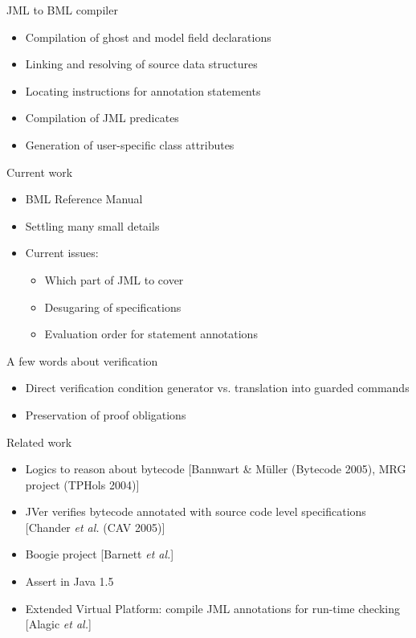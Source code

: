 \documentclass[final,nocolorBG,a4,mobius,nototal,pdf,slideColor]{prosper}
\begin{document}
\begin{slide}{JML to BML compiler}
\begin{itemize}
\item Compilation of ghost and model field declarations

\item Linking and resolving of source data structures

\item Locating instructions for annotation statements

\item Compilation of JML predicates

\item Generation of user-specific class attributes
\end{itemize}
\end{slide}

\begin{slide}{Current work}
\begin{itemize}
\item BML Reference Manual
\item Settling many small details
\item Current issues:
\begin{itemize}
\item Which part of JML to cover
\item Desugaring of specifications
\item Evaluation order for statement annotations
\end{itemize}
\end{itemize}
\end{slide}

\begin{slide}{A few words about verification}
\begin{itemize}
\item Direct verification condition generator vs. translation into guarded commands 
\item Preservation of proof obligations
\end{itemize}
\end{slide}

\begin{slide}{Related work}
\begin{itemize}
\item Logics to reason about bytecode [Bannwart \& M\"uller (Bytecode 2005), MRG project (TPHols 2004)]
\item JVer verifies bytecode annotated with source code level specifications
[Chander \emph{et al.} (CAV 2005)]
\item Boogie project [Barnett \emph{et al.}]
\item Assert in Java 1.5
\item Extended Virtual Platform: compile JML annotations for run-time checking
[Alagic \emph{et al.}]
\end{itemize}
\end{slide}
\end{document}
